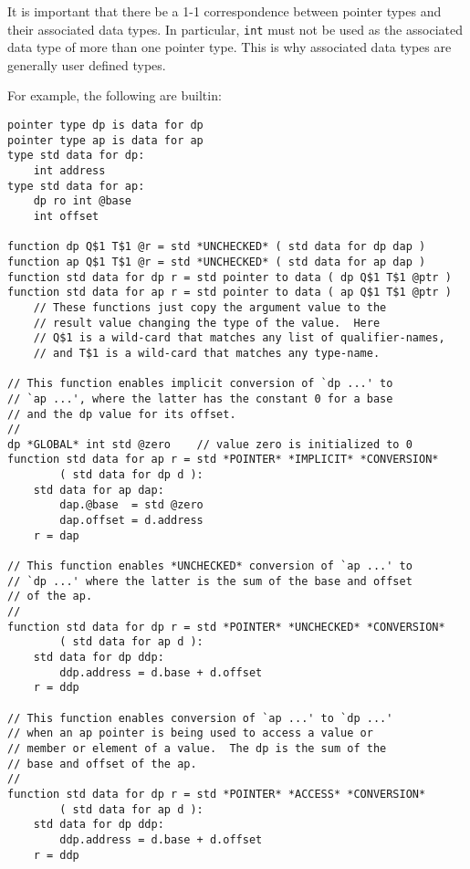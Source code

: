 \documentclass[12pt]{article}
\newenvironment{indpar}[1][0.3in]%
	{\begin{list}{}%
		     {\setlength{\itemsep}{0in}%
		      \setlength{\topsep}{0in}%
		      \setlength{\parsep}{1ex}%
		      \setlength{\labelwidth}{#1}%
		      \setlength{\leftmargin}{#1}%
		      \addtolength{\leftmargin}{\labelsep}}%
	 \item}%
	{\end{list}}
\begin{document}
It is important that there be a 1-1 correspondence between
pointer types and their associated data types.  In particular,
{\tt int} must not be used as the associated data type of
more than one pointer type.  This is why associated data types
are generally user defined types.

For example, the following are builtin:

\begin{indpar}\begin{verbatim}
pointer type dp is data for dp
pointer type ap is data for ap
type std data for dp:
    int address
type std data for ap:
    dp ro int @base
    int offset

function dp Q$1 T$1 @r = std *UNCHECKED* ( std data for dp dap )
function ap Q$1 T$1 @r = std *UNCHECKED* ( std data for ap dap )
function std data for dp r = std pointer to data ( dp Q$1 T$1 @ptr )
function std data for ap r = std pointer to data ( ap Q$1 T$1 @ptr )
    // These functions just copy the argument value to the
    // result value changing the type of the value.  Here
    // Q$1 is a wild-card that matches any list of qualifier-names,
    // and T$1 is a wild-card that matches any type-name.

// This function enables implicit conversion of `dp ...' to
// `ap ...', where the latter has the constant 0 for a base
// and the dp value for its offset.
// 
dp *GLOBAL* int std @zero    // value zero is initialized to 0	
function std data for ap r = std *POINTER* *IMPLICIT* *CONVERSION*
        ( std data for dp d ):
    std data for ap dap:
        dap.@base  = std @zero
        dap.offset = d.address
    r = dap

// This function enables *UNCHECKED* conversion of `ap ...' to
// `dp ...' where the latter is the sum of the base and offset
// of the ap.
//
function std data for dp r = std *POINTER* *UNCHECKED* *CONVERSION*
        ( std data for ap d ):
    std data for dp ddp:
        ddp.address = d.base + d.offset
    r = ddp

// This function enables conversion of `ap ...' to `dp ...'
// when an ap pointer is being used to access a value or
// member or element of a value.  The dp is the sum of the
// base and offset of the ap.
//
function std data for dp r = std *POINTER* *ACCESS* *CONVERSION*
        ( std data for ap d ):
    std data for dp ddp:
        ddp.address = d.base + d.offset
    r = ddp
\end{verbatim}\end{indpar}
\end{document}
